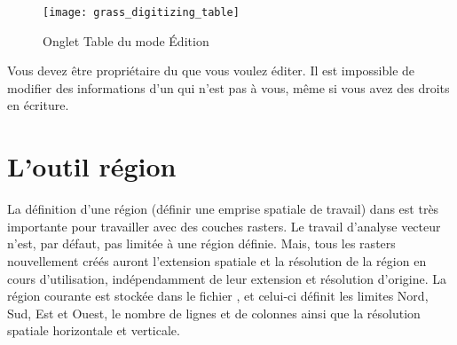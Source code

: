 {\begin{figure}[ht]
 \begin{center}
 \texttt{[image: grass\_digitizing\_table]}
  \caption{Onglet Table du mode Édition \grass \nixcaption}\label{fig:grass_digitizing_table}
 \end{center}
\end{figure}

\begin{Tip}\caption{\textsc{Éditer les permissions \grass}}
Vous devez être propriétaire du  que vous voulez éditer. Il est impossible de modifier des informations d'un  qui n'est pas à vous, même si vous avez des droits en écriture.
\end{Tip} 

\section{L'outil région \grass}\label{sec:grass_region}

La définition d'une région (définir une emprise spatiale de travail) dans \grass est très importante pour travailler avec des couches rasters. Le travail d'analyse vecteur n'est, par défaut, pas limitée à une région définie. Mais, tous les rasters nouvellement créés auront l'extension spatiale et la résolution de la région \grass en cours d'utilisation, indépendamment de leur extension et résolution d'origine. La région courante \grass est stockée dans le fichier , et celui-ci définit les limites Nord, Sud, Est et Ouest, le nombre de lignes et de colonnes ainsi que la résolution spatiale horizontale et verticale.

}
